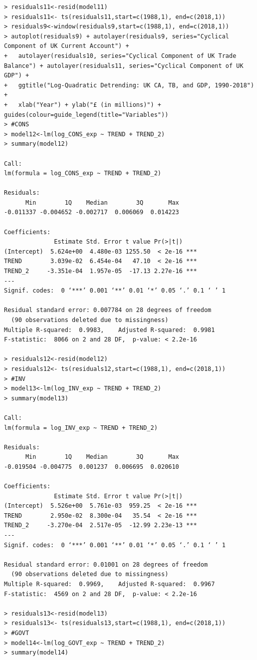 \documentclass[12pt]{article}
\begin{document}
\begin{verbatim}
> residuals11<-resid(model11)
> residuals11<- ts(residuals11,start=c(1988,1), end=c(2018,1))
> residuals9<-window(residuals9,start=c(1988,1), end=c(2018,1)) 
> autoplot(residuals9) + autolayer(residuals9, series="Cyclical Component of UK Current Account") +
+   autolayer(residuals10, series="Cyclical Component of UK Trade Balance") + autolayer(residuals11, series="Cyclical Component of UK GDP") +
+   ggtitle("Log-Quadratic Detrending: UK CA, TB, and GDP, 1990-2018") + 
+   xlab("Year") + ylab("£ (in millions)") + guides(colour=guide_legend(title="Variables"))
> #CONS
> model12<-lm(log_CONS_exp ~ TREND + TREND_2)
> summary(model12)

Call:
lm(formula = log_CONS_exp ~ TREND + TREND_2)

Residuals:
      Min        1Q    Median        3Q       Max 
-0.011337 -0.004652 -0.002717  0.006069  0.014223 

Coefficients:
              Estimate Std. Error t value Pr(>|t|)    
(Intercept)  5.624e+00  4.480e-03 1255.50  < 2e-16 ***
TREND        3.039e-02  6.454e-04   47.10  < 2e-16 ***
TREND_2     -3.351e-04  1.957e-05  -17.13 2.27e-16 ***
---
Signif. codes:  0 ‘***’ 0.001 ‘**’ 0.01 ‘*’ 0.05 ‘.’ 0.1 ‘ ’ 1

Residual standard error: 0.007784 on 28 degrees of freedom
  (90 observations deleted due to missingness)
Multiple R-squared:  0.9983,	Adjusted R-squared:  0.9981 
F-statistic:  8066 on 2 and 28 DF,  p-value: < 2.2e-16

> residuals12<-resid(model12)
> residuals12<- ts(residuals12,start=c(1988,1), end=c(2018,1))
> #INV
> model13<-lm(log_INV_exp ~ TREND + TREND_2)
> summary(model13)

Call:
lm(formula = log_INV_exp ~ TREND + TREND_2)

Residuals:
      Min        1Q    Median        3Q       Max 
-0.019504 -0.004775  0.001237  0.006695  0.020610 

Coefficients:
              Estimate Std. Error t value Pr(>|t|)    
(Intercept)  5.526e+00  5.761e-03  959.25  < 2e-16 ***
TREND        2.950e-02  8.300e-04   35.54  < 2e-16 ***
TREND_2     -3.270e-04  2.517e-05  -12.99 2.23e-13 ***
---
Signif. codes:  0 ‘***’ 0.001 ‘**’ 0.01 ‘*’ 0.05 ‘.’ 0.1 ‘ ’ 1

Residual standard error: 0.01001 on 28 degrees of freedom
  (90 observations deleted due to missingness)
Multiple R-squared:  0.9969,	Adjusted R-squared:  0.9967 
F-statistic:  4569 on 2 and 28 DF,  p-value: < 2.2e-16

> residuals13<-resid(model13)
> residuals13<- ts(residuals13,start=c(1988,1), end=c(2018,1))
> #GOVT
> model14<-lm(log_GOVT_exp ~ TREND + TREND_2)
> summary(model14)


\end{verbatim}
\end{document}
